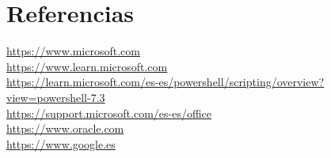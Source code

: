 \documentclass[a4paper, 12pt]{book}
\begin{document}

\cleardoublepage
\chapter{Referencias}
\label{chap:Referencias}

\url{https://www.microsoft.com}
\\

\url{https://www.learn.microsoft.com}
\\

\url{https://learn.microsoft.com/es-es/powershell/scripting/overview?view=powershell-7.3}
\\

\url{https://support.microsoft.com/es-es/office}
\\

\url{https://www.oracle.com}
\\

\url{https://www.google.es}
\end{document}
